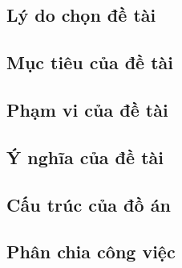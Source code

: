 \subsection{Lý do chọn đề tài}

\subsection{Mục tiêu của đề tài}

\subsection{Phạm vi của đề tài}

\subsection{Ý nghĩa của đề tài}

\subsection{Cấu trúc của đồ án}

\subsection{Phân chia công việc}
